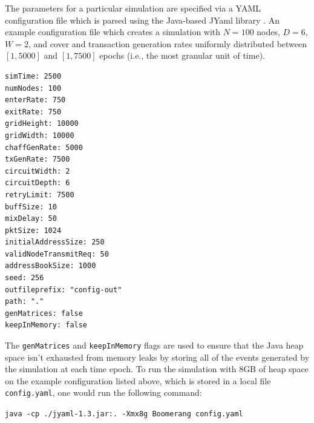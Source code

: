 The parameters for a particular simulation are specified via a YAML configuration file which is parsed using the Java-based JYaml library \cite{jyaml}. An example configuration file which creates a simulation with $N = 100$ nodes, $D = 6$, $W = 2$, and cover and transaction generation rates uniformly distributed between $[1, 5000]$ and $[1, 7500]$ epochs (i.e., the most granular unit of time).

\begin{lstlisting}
simTime: 2500
numNodes: 100
enterRate: 750
exitRate: 750
gridHeight: 10000
gridWidth: 10000
chaffGenRate: 5000
txGenRate: 7500
circuitWidth: 2
circuitDepth: 6
retryLimit: 7500
buffSize: 10
mixDelay: 50
pktSize: 1024
initialAddressSize: 250
validNodeTransmitReq: 50
addressBookSize: 1000
seed: 256
outfileprefix: "config-out"
path: "."
genMatrices: false
keepInMemory: false
\end{lstlisting}

The {\tt genMatrices} and {\tt keepInMemory} flags are used to ensure that the Java heap space isn't exhausted from memory leaks by storing all of the events generated by the simulation at each time epoch. To run the simulation with 8GB of heap space on the example configuration listed above, which is stored in a local file {\tt config.yaml}, one would run the following command:

\begin{center}
{\small \tt java -cp ./jyaml-1.3.jar:. -Xmx8g Boomerang config.yaml}
\end{center}

